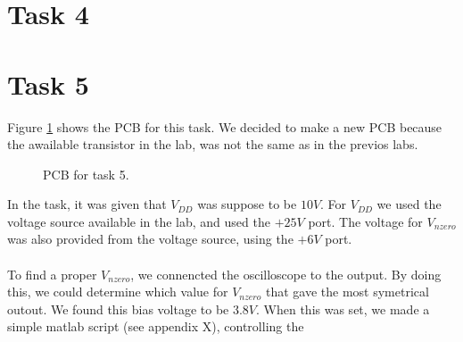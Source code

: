 \documentclass[a4paper,english,11pt]{article}
\begin{document}
\section{Task 4}

\section{Task 5}
Figure \ref{fig:pcb} shows the PCB for this task. We decided to make a new PCB because the awailable transistor in the lab, was not the same as in the previos labs.
\begin{figure}[!htbp]
 \centering
  \caption{PCB for task 5.}
  \label{fig:pcb}	
\end{figure}
In the task, it was given that $V_{DD}$ was suppose to be $10 V$. For $V_{DD}$ we used the voltage source available in the lab, and used the $+ 25V$ port.
The voltage for $V_{nzero}$ was also provided from the voltage source, using the $+ 6V$ port.\\
\\
To find a proper $V_{nzero}$, we connencted the oscilloscope to the output. By doing this, we could determine which value for $V_{nzero}$ that gave the 
most symetrical outout. We found this bias voltage to be $3.8V$. When this was set, we made a simple matlab script (see appendix X), controlling the 
\end{document}
